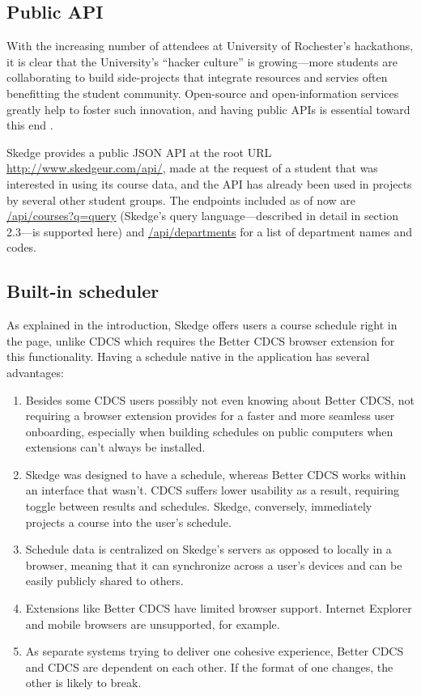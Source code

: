 \subsection{Public API}

With the increasing number of attendees at University of Rochester's hackathons, it is clear that the University's ``hacker culture'' is growing---more students are collaborating to build side-projects that integrate resources and servies often benefitting the student community. Open-source and open-information services greatly help to foster such innovation, and having public APIs is essential toward this end \cite{Milberry}\cite{hackers}.

Skedge provides a public JSON API at the root URL \url{http://www.skedgeur.com/api/}, made at the request of a student that was interested in using its course data, and the API has already been used in projects by several other student groups. The endpoints included as of now are \url{/api/courses?q=query} (Skedge's query language---described in detail in section 2.3---is supported here) and \url{/api/departments} for a list of department names and codes.

\subsection{Built-in scheduler}

As explained in the introduction, Skedge offers users a course schedule right in the page, unlike CDCS which requires the Better CDCS browser extension for this functionality. Having a schedule native in the application has several advantages:

\begin{enumerate}
\item Besides some CDCS users possibly not even knowing about Better CDCS, not requiring a browser extension provides for a faster and more seamless user onboarding, especially when building schedules on public computers when extensions can't always be installed.

\item Skedge was designed to have a schedule, whereas Better CDCS works within an interface that wasn't. CDCS suffers lower usability as a result, requiring toggle between results and schedules. Skedge, conversely, immediately projects a course into the user's schedule.

\item Schedule data is centralized on Skedge's servers as opposed to locally in a browser, meaning that it can synchronize across a user's devices and can be easily publicly shared to others.

\item Extensions like Better CDCS have limited browser support. Internet Explorer and mobile browsers are unsupported, for example.

\item As separate systems trying to deliver one cohesive experience, Better CDCS and CDCS are dependent on each other. If the format of one changes, the other is likely to break.
\end{enumerate}
